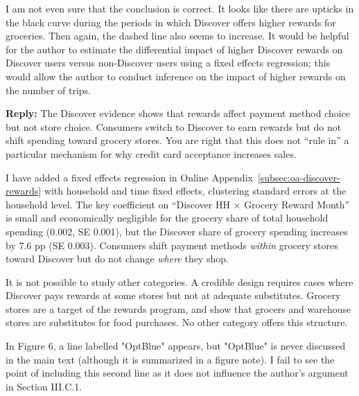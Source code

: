 \documentclass[main.tex]{subfiles}
\begin{document}
\begin{refsection}
\begin{refcommentnoclear}
\item I am not even sure that the conclusion is correct. It looks like there are upticks in the black curve during the periods in which Discover offers higher rewards for groceries.
Then again, the dashed line also seems to increase.
It would be helpful for the author to estimate the differential impact of higher Discover rewards on Discover users versus non-Discover users using a fixed effects regression; this would allow the author to conduct inference on the impact of higher rewards on the number of trips.
\end{refcommentnoclear}

\textbf{Reply:} The Discover evidence shows that rewards affect payment method choice but not store choice.
Consumers switch to Discover to earn rewards but do not shift spending toward grocery stores.
You are right that this does not ``rule in'' a particular mechanism for why credit card acceptance increases sales.

I have added a fixed effects regression in Online Appendix~\ref{subsec:oa-discover-rewards} with household and time fixed effects, clustering standard errors at the household level.
The key coefficient on ``Discover HH $\times$ Grocery Reward Month'' is small and economically negligible for the grocery share of total household spending (0.002, SE 0.001), but the Discover share of grocery spending increases by 7.6 pp (SE 0.003).
Consumers shift payment methods \emph{within} grocery stores toward Discover but do not change \emph{where} they shop.

It is not possible to study other categories. A credible design requires cases where Discover pays rewards at some stores but not at adequate substitutes. Grocery stores are a target of the rewards program, and \textcite{Ellickson.etal2020} show that grocers and warehouse stores are substitutes for food purchases. No other category offers this structure.

\begin{refcommentnoclear}
In Figure 6, a line labelled "OptBlue" appears, but "OptBlue" is never discussed in the main text (although it is summarized in a figure note).
I fail to see the point of including this second line as it does not influence the author's argument in Section III.C.1.


\end{refcommentnoclear}
\end{refsection}
\end{document}
